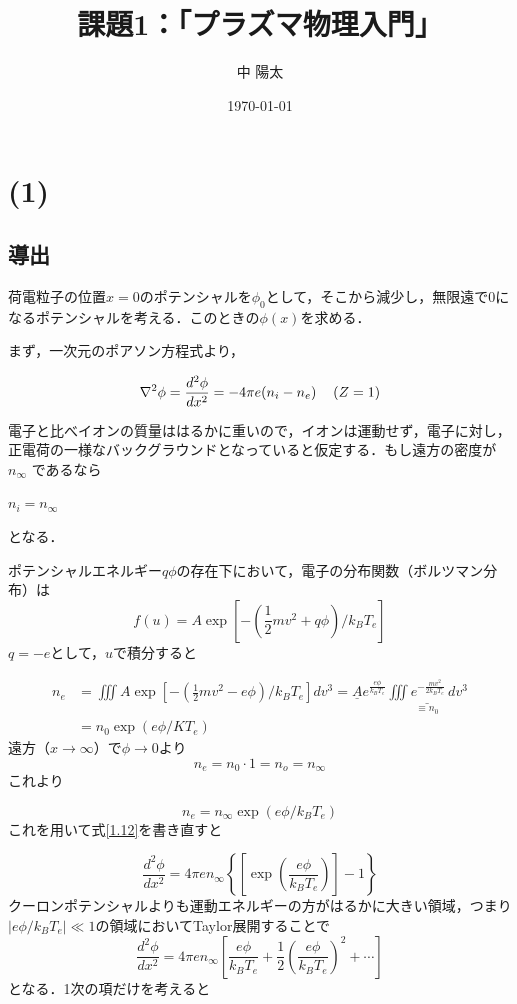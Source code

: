 \documentclass{ltjsarticle}
\title{課題1：「プラズマ物理入門」}
\author{中 陽太}
\date{\today}
\numberwithin{equation}{section} %
\numberwithin{equation}{section}
\begin{document}
\maketitle
\setcounter{section}{1}
\section*{(1)}

\subsection*{導出}
荷電粒子の位置$x=0$のポテンシャルを$\phi _0$として，そこから減少し，無限遠で0になるポテンシャルを考える．このときの$\phi (x)$を求める．

まず，一次元のポアソン方程式より，

\begin{equation}
  \nabla^2 \phi = \frac{d^2\phi}{dx^2} = -4\pi e(n_i - n_e) \hspace{1pc}  (Z=1) \label{1.12}
\end{equation}

電子と比べイオンの質量ははるかに重いので，イオンは運動せず，電子に対し，正電荷の一様なバックグラウンドとなっていると仮定する．もし遠方の密度が$n_\infty$ であるなら
\begin{center}
  $n_i = n_\infty$
\end{center}
となる．

ポテンシャルエネルギー$q\phi$の存在下において，電子の分布関数（ボルツマン分布）は
\[
  f(u) = A\exp\left[-\left(\frac{1}{2}mv^2 + q\phi\right)/k_BT_e\right]
\]
$q=-e$として，$u$で積分すると

\begin{align*}
  n_e &= \iiint A\exp\left[-\left(\frac{1}{2}mv^2 - e\phi\right)/k_BT_e\right]dv^3 = \underline{A}e^{\frac{e\phi}{k_B T_e}} 
\underset{\equiv n_0}{\underline{\iiint e^{-\frac{m v^2}{2 k_BT_e}} \, dv^3}}\\
       &= n_0 \exp(e\phi/KT_e)
\end{align*}
遠方（$x\to \infty$）で$\phi \to 0$より
\[
  n_e = n_0\cdot 1 = n_o = n_\infty
\]
これより

\[
 n_e =  n_\infty \exp(e\phi/k_BT_e)
\]
これを用いて式\eqref{1.12}を書き直すと

\[
  \frac{d^2\phi}{dx^2}= 4\pi en_\infty\left\{\left[\exp{\left(\frac{e\phi}{k_BT_e}\right)}\right]-1\right\}
\]
クーロンポテンシャルよりも運動エネルギーの方がはるかに大きい領域，つまり$|e\phi / k_BT_e| \ll 1$の領域においてTaylor展開することで
\begin{equation}
  \frac{d^2\phi}{dx^2} = 4\pi en_\infty\left[\frac{e\phi}{k_BT_e}+ \frac{1}{2}\left(\frac{e\phi}{k_BT_e}\right)^2 + \cdots \right] \label{1.13}
\end{equation}
となる．1次の項だけを考えると
\end{document}
